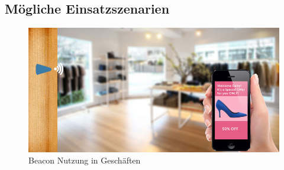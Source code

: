 \subsection{Mögliche Einsatzszenarien}
\begin{figure} 
\centering
\includegraphics[scale=0.3]{Bilder/iBeaconShoe}
\caption{Beacon Nutzung in Geschäften \cite{Shoe}}
\label{fig:Shoe}
\end{figure}
